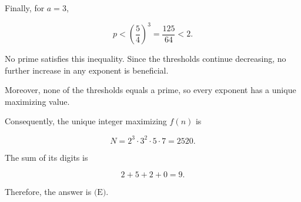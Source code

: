 \begin{enumerate}
 Finally, for $a=3$,

 
 \[p<\left(\frac54\right)^3=\frac{125}{64}<2.\]

 No prime satisfies this inequality. Since the thresholds continue decreasing, no further increase in any exponent is beneficial.

 Moreover, none of the thresholds equals a prime, so every exponent has a unique maximizing value.

 Consequently, the unique integer maximizing $f(n)$ is

 
 \[N=2^3\cdot3^2\cdot5\cdot7=2520.\]

 The sum of its digits is

 
 \[2+5+2+0=\boxed{9}.\]

 Therefore, the answer is $\boxed{\text{(E)}}$.

 


\end{enumerate}